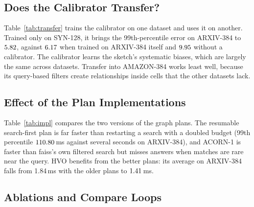 \documentclass[sigconf,nonacm]{acmart}
\begin{document}
\subsection{Does the Calibrator Transfer?}\label{sec:eval_transfer}
Table~\ref{tab:transfer} trains the calibrator on one dataset and uses it on another. Trained only on SYN-128, it brings the 99th-percentile error on ARXIV-384 to $5.82$, against $6.17$ when trained on ARXIV-384 itself and $9.95$ without a calibrator. The calibrator learns the sketch's systematic biases, which are largely the same across datasets. Transfer into AMAZON-384 works least well, because its query-based filters create relationships inside cells that the other datasets lack.

\subsection{Effect of the Plan Implementations}\label{sec:eval_impl}
Table~\ref{tab:impl} compares the two versions of the graph plans. The resumable search-first plan is far faster than restarting a search with a doubled budget (99th percentile $110.80$\,ms against several seconds on ARXIV-384), and ACORN-1 is faster than faiss's own filtered search but misses answers when matches are rare near the query. HVO benefits from the better plans: its average on ARXIV-384 falls from 1.84\,ms with the older plans to $1.41$\,ms.

\subsection{Ablations and Compare Loops}\label{sec:eval_hw}
\begin{table}[!t]
\footnotesize
\renewcommand{\arraystretch}{0.94}
\centering
\caption{Scan kernel sensitivity. $c_{\text{scan}}$: fitted cost per scanned vector. $s_g^*$ (\%): pre-filter boundary at $s_{\text{loc}}=0.3\%$ and $1\%$ for two predicate terms (Theorem~\ref{thm:crossover}; 100 means pre-filtering wins for every $s_g$, 0 that it never does). \#pre: queries for which the oracle / HVO choose $\Pi_{\text{pre}}$. Latencies in ms.}
\label{tab:hw}
\setlength{\tabcolsep}{2.6pt}
\end{table}
\end{document}
